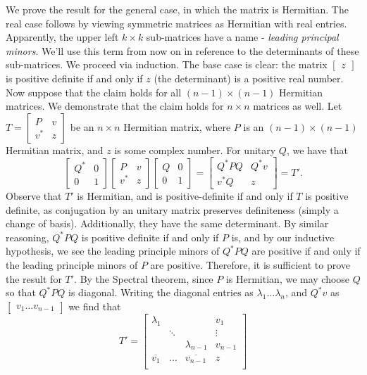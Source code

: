 \documentclass{scrartcl}
\begin{document}
\newpset


\begin{solution}
        We prove the result for the general case, in which the matrix is Hermitian. The real case follows by viewing symmetric matrices as Hermitian with real entries. Apparently, the upper left $k\times k$ sub-matrices have a name - \textit{leading principal minors}. We'll use this term from now on in reference to the determinants of these sub-matrices. We proceed via induction. The base case is clear: the matrix $\begin{bmatrix} z \end{bmatrix}$ is positive definite if and only if $z$ (the determinant) is a positive real number. Now suppose that the claim holds for all $(n-1) \times (n-1)$ Hermitian matrices. We demonstrate that the claim holds for $n\times n$ matrices as well. Let $T=\begin{bmatrix} P & v \\ v^\ast & z \end{bmatrix}$ be an $n\times n$ Hermitian matrix, where $P$ is an $(n-1) \times (n-1)$ Hermitian matrix, and $z$ is some complex number. For unitary $Q$, we have that
        \[\begin{bmatrix} Q^\ast & 0 \\ 0 & 1 \end{bmatrix} \begin{bmatrix} P & v \\ v^\ast & z \end{bmatrix} \begin{bmatrix} Q & 0 \\ 0 & 1 \end{bmatrix}=\begin{bmatrix} {Q^\ast} P Q & Q^\ast v \\ v^\ast Q & z \end{bmatrix}=T'.\]
        Observe that $T'$ is Hermitian, and is positive-definite if and only if $T$ is positive definite, as conjugation by an unitary matrix preserves definiteness (simply a change of basis). Additionally, they have the same determinant. By similar reasoning, ${Q^\ast} P Q$ is positive definite if and only if $P$ is, and by our inductive hypothesis, we see the leading principle minors of ${Q^\ast} P Q$ are positive if and only if the leading principle minors of $P$ are positive. Therefore, it is sufficient to prove the result for $T'$. By the Spectral theorem, since $P$ is Hermitian, we may choose $Q$ so that $Q^\ast PQ$ is diagonal. Writing the diagonal entries as $\lambda_1 \dots \lambda_n$, and $Q^\ast v$ as $\begin{bmatrix} v_1 \dots v_{n-1} \end{bmatrix}$ we find that 
        \[T'=\begin{bmatrix} 
        \lambda_1 & & & v_1 \\
            & \ddots & & \vdots \\
            & & \lambda_{n-1} & v_{n-1} \\
        \overline{v_1} & \hdots & \overline{v_{n-1}} & z \\
        \end{bmatrix}\]
    

\end{solution}
\end{document}
